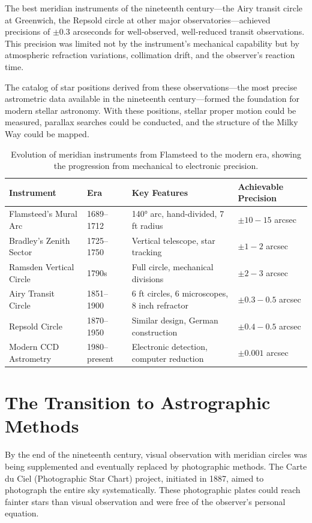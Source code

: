 The best meridian instruments of the nineteenth century—the Airy transit circle at Greenwich, the Repsold circle at other major observatories—achieved precisions of $\pm 0.3$ arcseconds for well-observed, well-reduced transit observations. This precision was limited not by the instrument's mechanical capability but by atmospheric refraction variations, collimation drift, and the observer's reaction time.

The catalog of star positions derived from these observations—the most precise astrometric data available in the nineteenth century—formed the foundation for modern stellar astronomy. With these positions, stellar proper motion could be measured, parallax searches could be conducted, and the structure of the Milky Way could be mapped.

\begin{table}[h]
\centering
\begin{tabularx}{\textwidth}{XXXX}
\toprule
\textbf{Instrument} & \textbf{Era} & \textbf{Key Features} & \textbf{Achievable Precision} \\
\midrule
Flamsteed's Mural Arc & 1689–1712 & 140° arc, hand-divided, 7 ft radius & $\pm 10-15$ arcsec \\
Bradley's Zenith Sector & 1725–1750 & Vertical telescope, star tracking & $\pm 1-2$ arcsec \\
Ramsden Vertical Circle & 1790s & Full circle, mechanical divisions & $\pm 2-3$ arcsec \\
Airy Transit Circle & 1851–1900 & 6 ft circles, 6 microscopes, 8 inch refractor & $\pm 0.3-0.5$ arcsec \\
Repsold Circle & 1870–1950 & Similar design, German construction & $\pm 0.4-0.5$ arcsec \\
Modern CCD Astrometry & 1980–present & Electronic detection, computer reduction & $\pm 0.001$ arcsec \\
\bottomrule
\end{tabularx}
\caption{Evolution of meridian instruments from Flamsteed to the modern era, showing the progression from mechanical to electronic precision.}
\end{table}

\section{The Transition to Astrographic Methods}

By the end of the nineteenth century, visual observation with meridian circles was being supplemented and eventually replaced by photographic methods. The Carte du Ciel (Photographic Star Chart) project, initiated in 1887, aimed to photograph the entire sky systematically. These photographic plates could reach fainter stars than visual observation and were free of the observer's personal equation.

